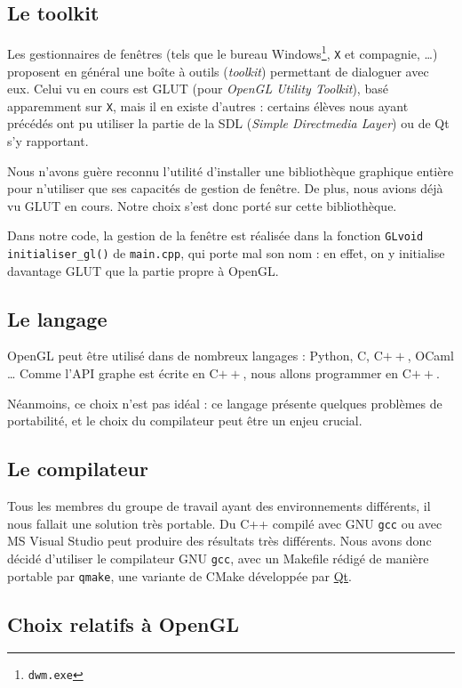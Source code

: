 \documentclass[a4paper, oneside, 11pt, twocolumn]{article}
\begin{document}
\subsection{Le toolkit}

Les gestionnaires de fenêtres (tels que le bureau Windows\footnote{\texttt{dwm.exe}}, \texttt{X} et compagnie, \dots) proposent en général une boîte à outils (\emph{toolkit}) permettant de dialoguer avec eux. Celui vu en cours est GLUT (pour \emph{OpenGL Utility Toolkit}), basé apparemment sur \texttt{X}, mais il en existe d'autres : certains élèves nous ayant précédés ont pu utiliser la partie de la SDL (\emph{Simple Directmedia Layer}) ou de Qt s'y rapportant.

Nous n'avons guère reconnu l'utilité d'installer une bibliothèque graphique entière pour n'utiliser que ses capacités de gestion de fenêtre. De plus, nous avions déjà vu GLUT en cours. Notre choix s'est donc porté sur cette bibliothèque.

Dans notre code, la gestion de la fenêtre est réalisée dans la fonction \texttt{GLvoid initialiser\_gl()} de \texttt{main.cpp}, qui porte mal son nom : en effet, on y initialise davantage GLUT que la partie propre à OpenGL.

\subsection{Le langage}

OpenGL peut être utilisé dans de nombreux langages : Python, C, C$++$, {\tiny OCaml} \dots{} Comme l'API graphe est écrite en C$++$, nous allons programmer en C$++$.

Néanmoins, ce choix n'est pas idéal : ce langage présente quelques problèmes de portabilité, et le choix du compilateur peut être un enjeu crucial.

\subsection{Le compilateur}

Tous les membres du groupe de travail ayant des environnements différents, il nous fallait une solution très portable. Du C++ compilé avec GNU \texttt{gcc} ou avec MS Visual Studio peut produire des résultats très différents. Nous avons donc décidé d'utiliser le compilateur GNU \texttt{gcc}, avec un Makefile rédigé de manière portable par \texttt{qmake}, une variante de CMake développée par \href{http://www.qt.io/}{Qt}.

\subsection{Choix relatifs à OpenGL}
\end{document}
